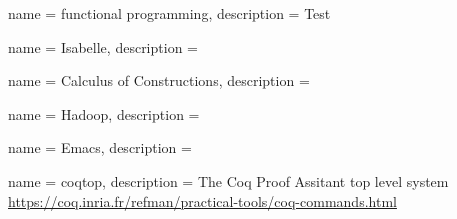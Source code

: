  
{name = functional programming,
description = {Test %
}}

{name = Isabelle,
description = {%
}}

{name = Calculus of Constructions,
description = {%
}}

{name = Hadoop,
description = {%
}}

{name = Emacs,
description = {%
}}

{name = coqtop, 
description = {The Coq Proof Assitant top level system \url{https://coq.inria.fr/refman/practical-tools/coq-commands.html}
}}






